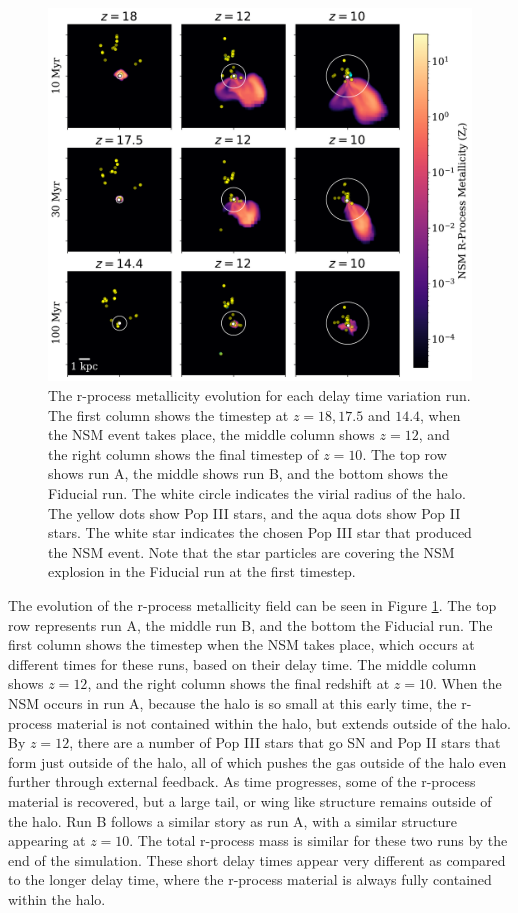 \documentclass[fleqn,usenatbib]{mnras}
\begin{document}
\begin{figure} 
	\includegraphics[width=\textwidth]{plots/time_NSM_evolution.pdf}
	\caption[Projections of the r-process metallicity field for each delay time variation run through time.]{The r-process metallicity evolution for each delay time variation run. The first column shows the timestep at $z = 18, 17.5$ and $14.4$, when the NSM event takes place, the middle column shows $z = 12$, and the right column shows the final timestep of $z = 10$. The top row shows run A, the middle shows run B, and the bottom shows the Fiducial run. The white circle indicates the virial radius of the halo. The yellow dots show Pop III stars, and the aqua dots show Pop II stars. The white star indicates the chosen Pop III star that produced the NSM event. Note that the star particles are covering the NSM explosion in the Fiducial run at the first timestep.}
	\label{fig:time_met4_evol}
\end{figure}

The evolution of the r-process metallicity field can be seen in Figure \ref{fig:time_met4_evol}. The top row represents run A, the middle run B, and the bottom the Fiducial run. The first column shows the timestep when the NSM takes place, which occurs at different times for these runs, based on their delay time. The middle column shows $z = 12$, and the right column shows the final redshift at $z = 10$. When the NSM occurs in run A, because the halo is so small at this early time, the r-process material is not contained within the halo, but extends outside of the halo. By $z = 12$, there are a number of Pop III stars that go SN and Pop II stars that form just outside of the halo, all of which pushes the gas outside of the halo even further through external feedback. As time progresses, some of the r-process material is recovered, but a large tail, or wing like structure remains outside of the halo. Run B follows a similar story as run A, with a similar structure appearing at $z = 10$. The total r-process mass is similar for these two runs by the end of the simulation. These short delay times appear very different as compared to the longer delay time, where the r-process material is always fully contained within the halo.
\end{document}
